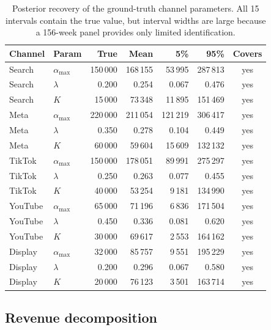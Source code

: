 \documentclass[a4paper,11pt]{article}
\begin{document}
\begin{table}[H]
\centering
\footnotesize
\begin{tabular}{l l r r r r c}
\toprule
\textbf{Channel} & \textbf{Param} & \textbf{True} & \textbf{Mean} & \textbf{5\%} & \textbf{95\%} & \textbf{Covers} \\
\midrule
Search  & $\alpha_{\max}$ & 150\,000 & 168\,155 & 53\,995  & 287\,813 & yes \\
Search  & $\lambda$       & 0.200   & 0.254   & 0.067  & 0.476   & yes \\
Search  & $K$             & 15\,000 & 73\,348  & 11\,895 & 151\,469 & yes \\
Meta    & $\alpha_{\max}$ & 220\,000 & 211\,054 & 121\,219 & 306\,417 & yes \\
Meta    & $\lambda$       & 0.350   & 0.278   & 0.104  & 0.449   & yes \\
Meta    & $K$             & 60\,000 & 59\,604  & 15\,609 & 132\,132 & yes \\
TikTok  & $\alpha_{\max}$ & 150\,000 & 178\,051 & 89\,991 & 275\,297 & yes \\
TikTok  & $\lambda$       & 0.250   & 0.263   & 0.077  & 0.455   & yes \\
TikTok  & $K$             & 40\,000 & 53\,254  & 9\,181  & 134\,990 & yes \\
YouTube & $\alpha_{\max}$ & 65\,000  & 71\,196  & 6\,836  & 171\,504 & yes \\
YouTube & $\lambda$       & 0.450   & 0.336   & 0.081  & 0.620   & yes \\
YouTube & $K$             & 30\,000 & 69\,617  & 2\,553  & 164\,162 & yes \\
Display & $\alpha_{\max}$ & 32\,000 & 85\,757  & 9\,551  & 195\,229 & yes \\
Display & $\lambda$       & 0.200   & 0.296   & 0.067  & 0.580   & yes \\
Display & $K$             & 20\,000 & 76\,123  & 3\,501  & 163\,714 & yes \\
\bottomrule
\end{tabular}
\caption{Posterior recovery of the ground-truth channel parameters. All 15 intervals contain the true value, but interval widths are large because a 156-week panel provides only limited identification.}
\end{table}

\subsection{Revenue decomposition}
\end{document}
